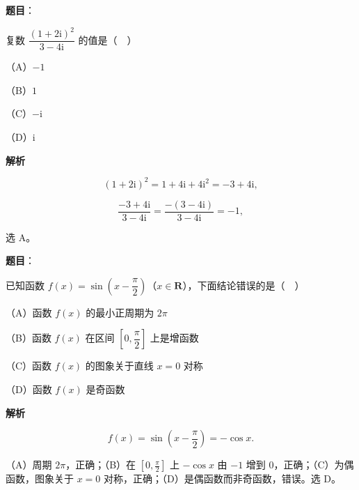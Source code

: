 \begin{answer}

\textbf{题目}：

复数 $\dfrac{(1+2\mathrm i)^2}{3-4\mathrm i}$ 的值是（　）

（A）$-1$

（B）$1$

（C）$-\mathrm i$

（D）$\mathrm i$

\textbf{解析}

\nopagebreak[4]
\[(1+2\mathrm i)^2=1+4\mathrm i+4\mathrm i^2=-3+4\mathrm i,\]

\nopagebreak[4]
\[\frac{-3+4\mathrm i}{3-4\mathrm i}=\frac{-(3-4\mathrm i)}{3-4\mathrm i}=-1,\]

选 A。


\end{answer}
\begin{answer}

\textbf{题目}：

已知函数 $f(x)=\sin\left(x-\dfrac{\pi}{2}\right)$（$x\in\mathbf R$），下面结论错误的是（　）

（A）函数 $f(x)$ 的最小正周期为 $2\pi$

（B）函数 $f(x)$ 在区间 $\left[0,\dfrac{\pi}{2}\right]$ 上是增函数

（C）函数 $f(x)$ 的图象关于直线 $x=0$ 对称

（D）函数 $f(x)$ 是奇函数

\textbf{解析}

\nopagebreak[4]
\[f(x)=\sin\left(x-\frac\pi2\right)=-\cos x .\]

（A）周期 $2\pi$，正确；（B）在 $\left[0,\frac\pi2\right]$ 上 $-\cos x$ 由 $-1$ 增到 $0$，正确；（C）为偶函数，图象关于 $x=0$ 对称，正确；（D）是偶函数而非奇函数，错误。选 D。


\end{answer}
